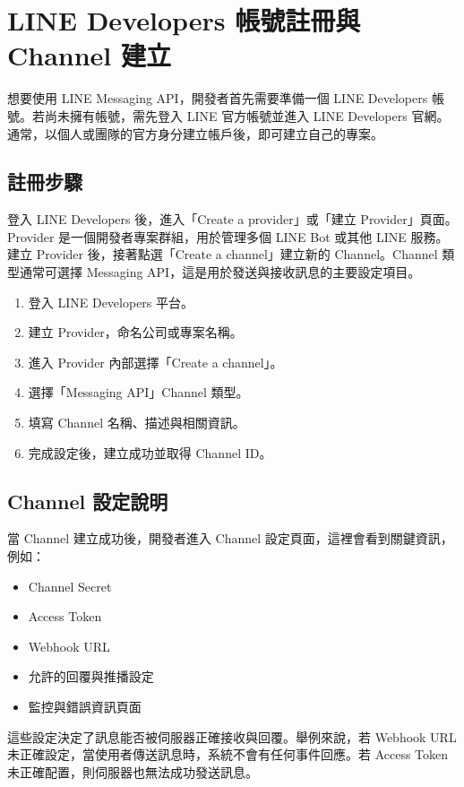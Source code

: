 \section{LINE Developers 帳號註冊與 Channel 建立}

想要使用 LINE Messaging API，開發者首先需要準備一個 LINE Developers 帳號。若尚未擁有帳號，需先登入 LINE 官方帳號並進入 LINE Developers 官網。通常，以個人或團隊的官方身分建立帳戶後，即可建立自己的專案。

\subsection{註冊步驟}

登入 LINE Developers 後，進入「Create a provider」或「建立 Provider」頁面。Provider 是一個開發者專案群組，用於管理多個 LINE Bot 或其他 LINE 服務。建立 Provider 後，接著點選「Create a channel」建立新的 Channel。Channel 類型通常可選擇 Messaging API，這是用於發送與接收訊息的主要設定項目。

\begin{enumerate}[leftmargin=2em]
    \item 登入 LINE Developers 平台。
    \item 建立 Provider，命名公司或專案名稱。
    \item 進入 Provider 內部選擇「Create a channel」。
    \item 選擇「Messaging API」Channel 類型。
    \item 填寫 Channel 名稱、描述與相關資訊。
    \item 完成設定後，建立成功並取得 Channel ID。
\end{enumerate}

\subsection{Channel 設定說明}

當 Channel 建立成功後，開發者進入 Channel 設定頁面，這裡會看到關鍵資訊，例如：
\begin{itemize}[leftmargin=2em]
    \item Channel Secret
    \item Access Token
    \item Webhook URL
    \item 允許的回覆與推播設定
    \item 監控與錯誤資訊頁面
\end{itemize}

這些設定決定了訊息能否被伺服器正確接收與回覆。舉例來說，若 Webhook URL 未正確設定，當使用者傳送訊息時，系統不會有任何事件回應。若 Access Token 未正確配置，則伺服器也無法成功發送訊息。

